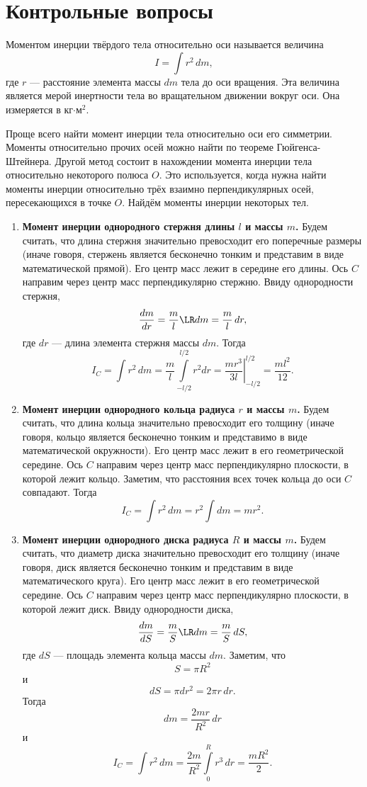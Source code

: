\section{Контрольные вопросы}

\begin{Enumerate}
	\item Моментом инерции твёрдого тела относительно оси называется величина
	\[
	I=\int r^2\,dm,
	\]
	где $r$ --- расстояние элемента массы $dm$ тела до оси вращения. Эта величина является мерой инертности тела во вращательном движении вокруг оси. Она измеряется в кг$\cdot$м$^2$.
	
	\item Проще всего найти момент инерции тела относительно оси его симметрии. Моменты относительно прочих осей можно найти по теореме Гюйгенса-Штейнера. Другой метод состоит в нахождении момента инерции тела относительно некоторого полюса $O$. Это используется, когда нужна найти моменты инерции относительно трёх взаимно перпендикулярных осей, пересекающихся в точке $O$. Найдём моменты инерции некоторых тел.
	\begin{enumerate}
		\item \textbf{Момент инерции однородного стержня длины $l$ и массы $m$.} Будем считать, что длина стержня значительно превосходит его поперечные размеры (иначе говоря, стержень является бесконечно тонким и представим в виде математической прямой). Его центр масс лежит в середине его длины. Ось $C$ направим через центр масс перпендикулярно стержню. Ввиду однородности стержня,
		\[
		\frac{dm}{dr}=\frac{m}{l}\LR dm=\frac{m}{l}\,dr,
		\]
		где $dr$ --- длина элемента стержня массы $dm$. Тогда
		\[
		I_C=\int r^2\,dm=\frac{m}{l}\int\limits_{-l/2}^{l/2}r^2dr=\left.\frac{mr^3}{3l}\right\vert_{-l/2}^{l/2}=\frac{ml^2}{12}.
		\]
		
		\item \textbf{Момент инерции однородного кольца радиуса $r$ и массы $m$.} Будем считать, что длина кольца значительно превосходит его толщину (иначе говоря, кольцо является бесконечно тонким и представимо в виде математической окружности). Его центр масс лежит в его геометрической  середине. Ось $C$ направим через центр масс перпендикулярно плоскости, в которой лежит кольцо. Заметим, что расстояния всех точек кольца до оси $C$ совпадают. Тогда
		\[
		I_C=\int r^2\,dm=r^2\int dm=mr^2.
		\]
		
		\item \textbf{Момент инерции однородного диска радиуса $R$ и массы $m$.} Будем считать, что диаметр диска значительно превосходит его толщину (иначе говоря, диск является бесконечно тонким и представим в виде математического круга). Его центр масс лежит в его геометрической  середине. Ось $C$ направим через центр масс перпендикулярно плоскости, в которой лежит диск. Ввиду однородности диска,
		\[
		\frac{dm}{dS}=\frac{m}{S}\LR dm=\frac{m}{S}\,dS,
		\]
		где $dS$ --- площадь элемента кольца массы $dm$. Заметим, что
		\[
		S=\pi R^2
		\]
		и
		\[
		dS=\pi dr^2=2\pi r\,dr.
		\]
		Тогда
		\[
		dm=\frac{2mr}{R^2}\,dr
		\]
		и
		\[
		I_C=\int r^2\,dm=\frac{2m}{R^2}\int\limits_{0}^{R}r^3\,dr=\frac{mR^2}{2}.
		\]
		

\end{enumerate}
\end{Enumerate}
